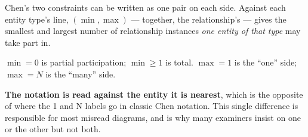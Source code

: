 \begin{definitionbox}
Chen's two constraints can be written as one pair on each side. Against each
entity type's line, $(\min,\max)$ --- together, the relationship's  --- gives the smallest and largest number of
relationship instances \emph{one entity of that type} may take part in.

\smallskip
$\min = 0$ is partial participation; $\min \ge 1$ is total. $\max = 1$ is the
``one'' side; $\max = N$ is the ``many'' side.

\smallskip
\textbf{The notation is read against the entity it is nearest}, which is the
opposite of where the 1 and N labels go in classic Chen notation. This single
difference is responsible for most misread diagrams, and is why many
examiners insist on one or the other but not both.
\end{definitionbox}

